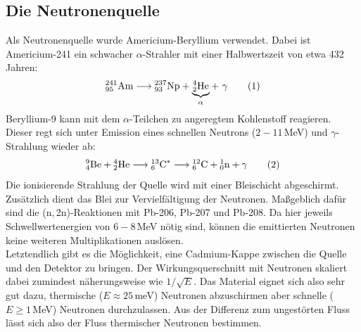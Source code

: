 \documentclass[german, parskip=full]{scrartcl}
\newcommand\numberthis{\addtocounter{equation}{1}\tag{\theequation}}
\newcommand{\tecxt}{}
\begin{document}
\subsection{Die Neutronenquelle}
Als Neutronenquelle wurde Americium-Beryllium verwendet. Dabei ist Americium-241 ein schwacher $\alpha$-Strahler mit einer Halbwertszeit von etwa 432 Jahren:
\begin{align*}
{}^{241}_{95}\tecxt\text{Am}\longrightarrow {}^{237}_{93}\tecxt\text{Np}+\underbrace{{}^{4}_{2}\tecxt\text{He}}_\alpha+\ \gamma\numberthis\label{eqn:Am241 Zerfall}
\end{align*}
Beryllium-9 kann mit dem $\alpha$-Teilchen zu angeregtem Kohlenstoff reagieren. Dieser regt sich unter Emission eines schnellen Neutrons ($2-11$\,MeV) und $\gamma$-Strahlung wieder ab:
\begin{align*}
{}^{9}_{4}\tecxt\text{Be}+{}^{4}_{2}\tecxt\text{He}\longrightarrow {}^{13}_{6}\tecxt\text{C}^\ast\longrightarrow {}^{12}_{6}\tecxt\text{C}+{}^{1}_{0}\tecxt\text{n}+\gamma\numberthis\label{eqn:Be9 alpha Einfang}
\end{align*}
Die ionisierende Strahlung der Quelle wird mit einer Bleischicht abgeschirmt. Zusätzlich dient das Blei zur Vervielfältigung der Neutronen. Maßgeblich dafür sind die (n,\,2n)-Reaktionen mit Pb-206, Pb-207 und Pb-208. Da hier jeweils Schwellwertenergien von $6-8$\,MeV nötig sind, können die emittierten Neutronen keine weiteren Multiplikationen auslösen.\\
Letztendlich gibt es die Möglichkeit, eine Cadmium-Kappe zwischen die Quelle und den Detektor zu bringen. Der Wirkungsquerschnitt mit Neutronen skaliert dabei zumindest näherungsweise wie $1/\sqrt{E}$. Das Material eignet sich also sehr gut dazu, thermische ($E\approx 25\,$meV) Neutronen abzuschirmen aber schnelle ($E\ge 1\,$MeV) Neutronen durchzulassen. Aus der Differenz zum ungestörten Fluss lässt sich also der Fluss thermischer Neutronen bestimmen.
\end{document}
